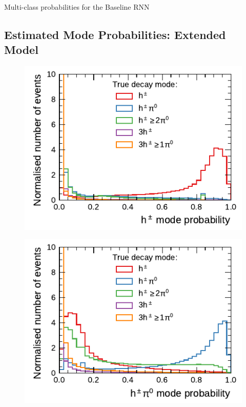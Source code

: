 \begin{minipage}{\textwidth}
\begin{subfigure}{0.48\textwidth}
  \end{subfigure}%

  \caption{Multi-class probabilities for the Baseline RNN}
  \label{fig:rnn_multiclass_proba_baseline}
\end{minipage}

\clearpage
\subsection{Estimated Mode Probabilities: Extended Model}
\label{app:combined_probabilities}

\noindent
\begin{minipage}{\textwidth}
  \captionsetup{type=figure}
  \begin{subfigure}{0.48\textwidth}
    \centering
    \includegraphics{./figures/decay_mode_classification/combined_proba/proba_1p0n.pdf}
  \end{subfigure}\hfill
  \begin{subfigure}{0.48\textwidth}
    \centering
    \includegraphics{./figures/decay_mode_classification/combined_proba/proba_1p1n.pdf}

\end{subfigure}
\end{minipage}
